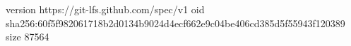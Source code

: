 version https://git-lfs.github.com/spec/v1
oid sha256:60f5f982061718b2d0134b9024d4ecf662e9c04be406cd385d5f55943f120389
size 87564
